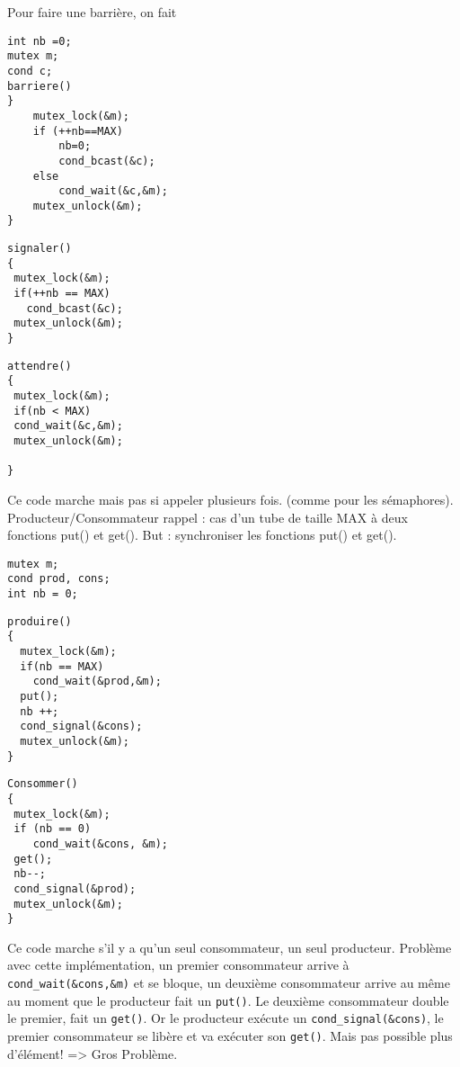\documentclass[12pt,a4paper]{report}
\begin{document}
Pour faire une barrière, on fait

\begin{center}
\begin{verbatim}
int nb =0;
mutex m;
cond c;
barriere()
}
    mutex_lock(&m);
    if (++nb==MAX)
        nb=0;
        cond_bcast(&c);
    else
        cond_wait(&c,&m);
    mutex_unlock(&m);
}
\end{verbatim}
\end{center}

\begin{minipage}{0.6\linewidth}
\begin{verbatim}
signaler()
{
 mutex_lock(&m);
 if(++nb == MAX)
   cond_bcast(&c);
 mutex_unlock(&m);
}
\end{verbatim}
\end{minipage}
\begin{minipage}{0.6\linewidth}
\begin{verbatim}
attendre()
{
 mutex_lock(&m);
 if(nb < MAX) 
 cond_wait(&c,&m);
 mutex_unlock(&m);
 
}
\end{verbatim}
\end{minipage}
Ce code marche mais pas si appeler plusieurs fois. (comme pour les sémaphores).\\

Producteur/Consommateur
rappel : cas d'un tube de taille MAX à deux fonctions put() et get(). But : synchroniser les fonctions put() et get().

\verb?mutex m;?\\
\verb?cond prod, cons;?\\
\verb?int nb = 0;?\\
\begin{minipage}{0.5\linewidth}
\begin{verbatim}
produire()
{
  mutex_lock(&m);
  if(nb == MAX)
    cond_wait(&prod,&m);
  put();
  nb ++;
  cond_signal(&cons);
  mutex_unlock(&m);
}
\end{verbatim}
\end{minipage}
\begin{minipage}{0.5\linewidth}
\begin{verbatim}
Consommer()
{
 mutex_lock(&m);
 if (nb == 0)
    cond_wait(&cons, &m);
 get();   
 nb--;
 cond_signal(&prod);
 mutex_unlock(&m);
}
\end{verbatim}
\end{minipage}
Ce code marche s'il y a qu'un seul consommateur, un seul producteur.
Problème avec cette implémentation, un premier consommateur arrive à  \verb?cond_wait(&cons,&m)? et se bloque, un deuxième consommateur arrive au même au moment que le producteur fait un \verb?put()?. Le deuxième consommateur double le premier, fait un \verb?get()?. Or le producteur exécute un \verb?cond_signal(&cons)?, le premier consommateur se libère et va exécuter son \verb?get()?. Mais pas possible plus d'élément! => Gros Problème.\\
\end{document}
